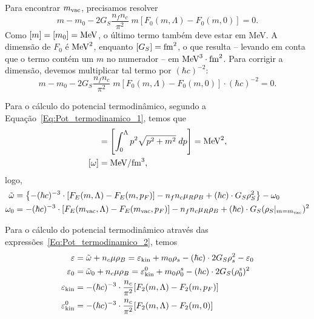 Para encontrar $m_{\rm{vac}}$, precisamos resolver
\begin{equation}
	m - m_0 - 2G_S\frac{n_f n_c}{\pi^2} \;m [F_0(m, \Lambda) - F_0(m,0)] = 0.
\end{equation}
%
Como $[m] = [m_0] = \rm{MeV}$, o último termo também deve estar em MeV. A dimensão de $F_0$ é $\rm{MeV}^2$, enquanto $[G_S] = \rm{fm}^2$, o que resulta -- levando em conta que o termo contém um $m$ no numerador -- em $\rm{MeV}^3\cdot\rm{fm}^2$. Para corrigir a dimensão, devemos multiplicar tal termo por $(\hbar c)^{-2}$:
\begin{equation}
	m - m_0 - 2G_S\frac{n_f n_c}{\pi^2} \;m [F_0(m, \Lambda) - F_0(m,0)] \cdot (\hbar c)^{-2} = 0.
\end{equation}

Para o cálculo do potencial termodinâmico, segundo a Equação~\ref{Eq:Pot_termodinamico_1}, temos que
\begin{align}
	[F_E] &= \left[\int_0^\Lambda p^2\sqrt{p^2+m^2} \;dp\right] = \rm{MeV}^2, \\
	[\omega] &= \rm{MeV}/\rm{fm}^3,
\end{align}
%
logo,
\begin{align}
	\tilde{\omega} &= \left\{- (\hbar c)^{-3} \cdot [F_E(m, \Lambda) - F_E(m, p_F)] - n_fn_c\mu_R\rho_B + (\hbar c) \cdot G_S\rho_S^2\right\} - \omega_0 \\
	\omega_0 &= - (\hbar c)^{-3} \cdot [F_E(m_{\rm{vac}}, \Lambda) - F_E(m_{\rm{vac}}, p_F)] - n_fn_c\mu_R\rho_B + (\hbar c) \cdot G_S(\rho_S|_{m = m_{\rm{vac}}})^2
\end{align}

Para o cálculo do potencial termodinâmico através das expressões~\eqref{Eq:Pot_termodinamico_2}, temos
\begin{subequations}
\begin{align}
	\varepsilon &= \tilde{\omega} + n_c\mu\rho_B = \varepsilon_{\rm{kin}} + m_0\rho_s - (\hbar c) \cdot 2G_S\rho_s^2 - \varepsilon_0\\
	\varepsilon_0 &= \tilde{\omega}_0 + n_c\mu\rho_B = \varepsilon_{\rm{kin}}^0 + m_0\rho_0^s - (\hbar c) \cdot 2G_S(\rho_0^s)^2 \\
	\varepsilon_{\rm{kin}} &= -(\hbar c)^{-3} \cdot \frac{n_c}{\pi^2} [F_2(m, \Lambda) - F_2(m, p_F)] \\
	\varepsilon_{\rm{kin}}^0 &= -(\hbar c)^{-3} \cdot \frac{n_c}{\pi^2} [F_2(m, \Lambda) - F_2(m, 0)]
\end{align}
\end{subequations}

